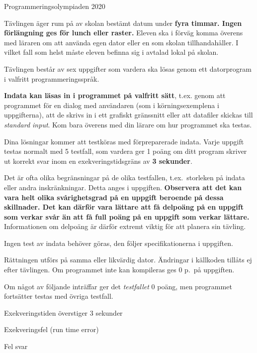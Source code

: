 
\thispagestyle{fancy}

\begin{center}
\Huge{Programmeringsolympiaden 2020}
\end{center}
\vspace{-1cm} 
\begin{lista}
\item Tävlingen äger rum på av skolan bestämt datum under {\bf fyra
    timmar. Ingen förlängning ges för lunch eller raster.} Eleven ska i förväg komma överens med läraren om att använda egen dator eller en som skolan tillhandahåller. I vilket fall som helst måste eleven befinna sig i avtalad lokal på skolan.
\item Tävlingen består av sex uppgifter som vardera ska lösas genom ett
  datorprogram i valfritt programmeringsspråk.
\item {\bf Indata kan läsas in i programmet på valfritt sätt}, t.ex. genom att programmet för en dialog med användaren (som i körningsexemplena i uppgifterna), att de skrivs in i ett grafiskt gränssnitt eller att datafiler skickas till {\em standard input}. Kom bara överens med din lärare om hur programmet ska testas.
\item Dina lösningar kommer att testköras med förpreparerade
  indata. Varje uppgift testas normalt med 5 testfall, som vardera ger
  1 poäng om ditt program skriver ut korrekt svar inom en exekveringstidsgräns av
  {\bf 3 sekunder}.
\item Det är ofta olika begränsningar på de olika testfallen, t.ex.\ storleken på
indata eller andra inskränkningar. Detta anges i uppgiften. {\bf Observera att det kan vara
helt olika svårighetsgrad på en uppgift beroende på dessa skillnader. Det kan därför vara
lättare att få delpoäng på en uppgift som verkar svår än att få full
poäng på en uppgift som verkar lättare.} Informationen om delpoäng är
därför extremt viktig för att planera sin
tävling.
\item Ingen test av indata behöver göras, den följer specifikationerna 
i uppgiften.
\item Rättningen utförs på samma eller likvärdig dator. Ändringar
  i källkoden tillåts ej efter tävlingen. Om programmet
  inte kan kompileras ges 0 p.\ på uppgiften. 
\item Om något av följande inträffar ger
  det {\em testfallet} 0 poäng, men programmet fortsätter testas med övriga testfall.
\begin{lista}
\item Exekveringstiden överstiger 3 sekunder \vspace{-0.2cm}
\item Exekveringsfel (run time error) \vspace{-0.2cm}
\item Fel svar \vspace{-0.2cm}
\end{lista}


\end{lista}
